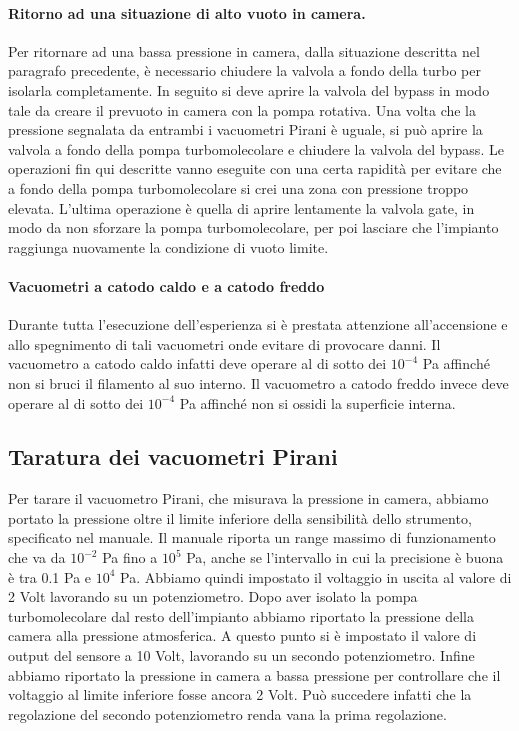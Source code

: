 \paragraph{Ritorno ad una situazione di alto vuoto in camera.\\}
Per ritornare ad una bassa pressione in camera, dalla situazione descritta nel paragrafo precedente, è necessario chiudere la valvola a fondo della turbo per isolarla completamente. In seguito si deve aprire la valvola del bypass in modo tale da creare il prevuoto in camera con la pompa rotativa. Una volta che la pressione segnalata da entrambi i vacuometri Pirani è uguale, si può aprire la valvola a fondo della pompa turbomolecolare e chiudere la valvola del bypass. Le operazioni fin qui descritte vanno eseguite con una certa rapidità per evitare che a fondo della pompa turbomolecolare si crei una zona con pressione troppo elevata. L'ultima operazione è quella di aprire lentamente la valvola gate, in modo da non sforzare la pompa turbomolecolare, per poi lasciare che l'impianto raggiunga nuovamente la condizione di vuoto limite.
\paragraph{Vacuometri a catodo caldo e a catodo freddo\\}
Durante tutta l'esecuzione dell'esperienza si è prestata attenzione all'accensione e allo spegnimento di tali vacuometri onde evitare di provocare danni. Il vacuometro a catodo caldo infatti deve operare al di sotto dei $10^{-4}$ \si{\pascal} affinché non si bruci il filamento al suo interno. Il vacuometro a catodo freddo invece deve operare al di sotto dei $10^{-4}$ \si{\pascal} affinché non si ossidi la superficie interna.

\subsection{Taratura dei vacuometri Pirani}

Per tarare il vacuometro Pirani, che misurava la pressione in camera, abbiamo portato la pressione oltre il limite inferiore
della sensibilità dello strumento, specificato nel manuale. Il manuale riporta un range massimo di funzionamento che va da $10^{-2}$ \si{\pascal} fino a $10^5$ \si{\pascal}, anche se l'intervallo in cui la precisione è buona è tra 0.1 \si{\pascal} e $10^4$ \si{\pascal}. Abbiamo quindi impostato il voltaggio in uscita al valore di 2 Volt lavorando su un potenziometro. Dopo aver isolato la pompa turbomolecolare dal resto dell'impianto abbiamo riportato la pressione della camera alla pressione atmosferica. A questo punto si è impostato il valore di output del sensore a 10 Volt, lavorando su un secondo potenziometro. Infine abbiamo riportato la pressione in camera a bassa pressione per controllare che il voltaggio al limite inferiore fosse ancora 2 Volt. Può succedere infatti che la regolazione del secondo potenziometro renda vana la prima regolazione.

